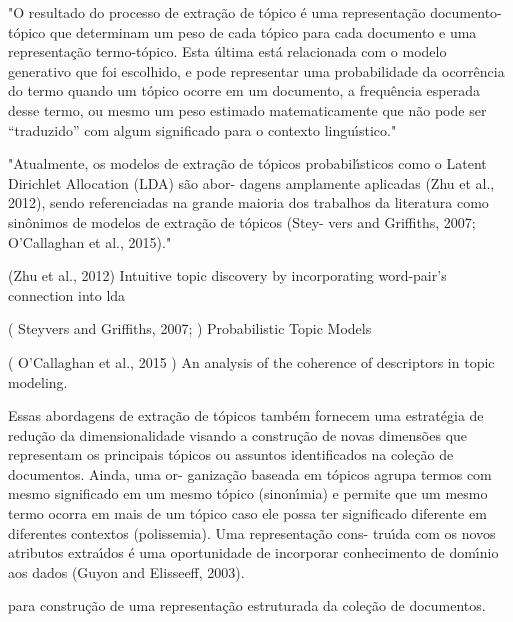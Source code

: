 "O resultado do processo de extração de tópico é uma representação documento-tópico que determinam um peso de cada tópico para cada documento e uma representação termo-tópico. Esta última está relacionada com o modelo generativo que foi escolhido, e pode representar uma probabilidade da ocorrência do termo quando um tópico ocorre em um documento, a frequência esperada desse termo, ou mesmo um peso estimado matematicamente que não pode ser “traduzido” com algum significado para o contexto linguı́stico."



"Atualmente, os modelos de extração de tópicos probabilı́sticos como o Latent Dirichlet Allocation (LDA) são abor- dagens amplamente aplicadas (Zhu et al., 2012), sendo referenciadas na grande maioria dos trabalhos da literatura como sinônimos de modelos de extração de tópicos (Stey- vers and Griffiths, 2007; O’Callaghan et al., 2015)."  

(Zhu et al., 2012)
Intuitive topic discovery by incorporating word-pair’s connection into lda

( Steyvers and Griffiths, 2007; )
Probabilistic Topic Models

( O’Callaghan et al., 2015 )
An analysis of the coherence of descriptors in topic modeling.







Essas abordagens de extração de tópicos também fornecem uma estratégia
de redução da dimensionalidade visando a construção de novas dimensões que representam
os principais tópicos ou assuntos identificados na coleção de documentos. Ainda, uma or-
ganização baseada em tópicos agrupa termos com mesmo significado em um mesmo tópico
(sinonı́mia) e permite que um mesmo termo ocorra em mais de um tópico caso ele possa
ter significado diferente em diferentes contextos (polissemia). Uma representação cons-
truı́da com os novos atributos extraı́dos é uma oportunidade de incorporar conhecimento
de domı́nio aos dados (Guyon and Elisseeff, 2003).


para construção de uma representação estruturada da coleção de documentos.





























